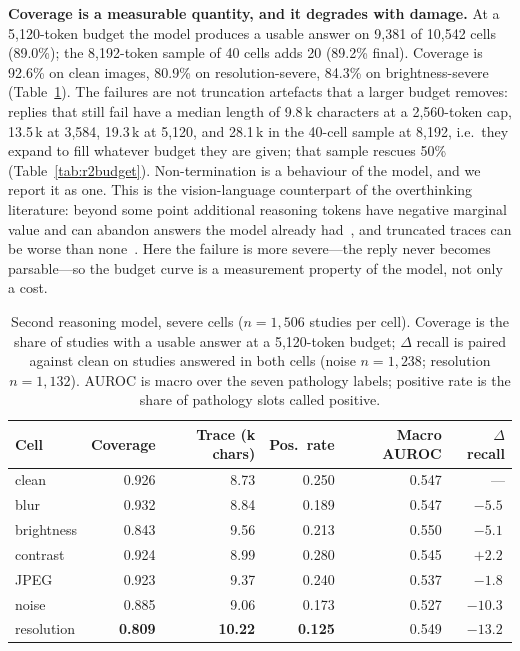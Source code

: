 \textbf{Coverage is a measurable quantity, and it degrades with damage.} At a 5,120-token budget the model produces a usable answer on 9,381 of 10,542 cells (89.0\%); the 8,192-token sample of 40 cells adds 20 (89.2\% final). Coverage is 92.6\% on clean images, 80.9\% on resolution-severe, 84.3\% on brightness-severe (Table~\ref{tab:r2think}). The failures are not truncation artefacts that a larger budget removes: replies that still fail have a median length of 9.8\,k characters at a 2,560-token cap, 13.5\,k at 3,584, 19.3\,k at 5,120, and 28.1\,k in the 40-cell sample at 8,192, i.e.\ they expand to fill whatever budget they are given; that sample rescues 50\% (Table~\ref{tab:r2budget}). Non-termination is a behaviour of the model, and we report it as one. This is the vision-language counterpart of the overthinking literature: beyond some point additional reasoning tokens have negative marginal value and can abandon answers the model already had~\citep{wu2026whenmore,zhou2026overthinking}, and truncated traces can be worse than none~\citep{su2026broken}. Here the failure is more severe---the reply never becomes parsable---so the budget curve is a measurement property of the model, not only a cost.

\begin{table}[t]
\centering
\small
\caption{Second reasoning model, severe cells ($n=1{,}506$ studies per cell). Coverage is the share of studies with a usable answer at a 5,120-token budget; $\Delta$ recall is paired against clean on studies answered in both cells (noise $n=1{,}238$; resolution $n=1{,}132$). AUROC is macro over the seven pathology labels; positive rate is the share of pathology slots called positive.}
\label{tab:r2think}
\begin{tabular}{lrrrrr}
\toprule
Cell & Coverage & Trace (k chars) & Pos.\ rate & Macro AUROC & $\Delta$ recall \\
\midrule
clean & 0.926 & 8.73 & 0.250 & 0.547 & --- \\
blur & 0.932 & 8.84 & 0.189 & 0.547 & $-5.5$\,\pp{} \\
brightness & 0.843 & 9.56 & 0.213 & 0.550 & $-5.1$\,\pp{} \\
contrast & 0.924 & 8.99 & 0.280 & 0.545 & $+2.2$\,\pp{} \\
JPEG & 0.923 & 9.37 & 0.240 & 0.537 & $-1.8$\,\pp{} \\
noise & 0.885 & 9.06 & 0.173 & 0.527 & $\mathbf{-10.3}$\,\pp{} \\
resolution & \textbf{0.809} & \textbf{10.22} & \textbf{0.125} & 0.549 & $\mathbf{-13.2}$\,\pp{} \\
\bottomrule
\end{tabular}
\end{table}

